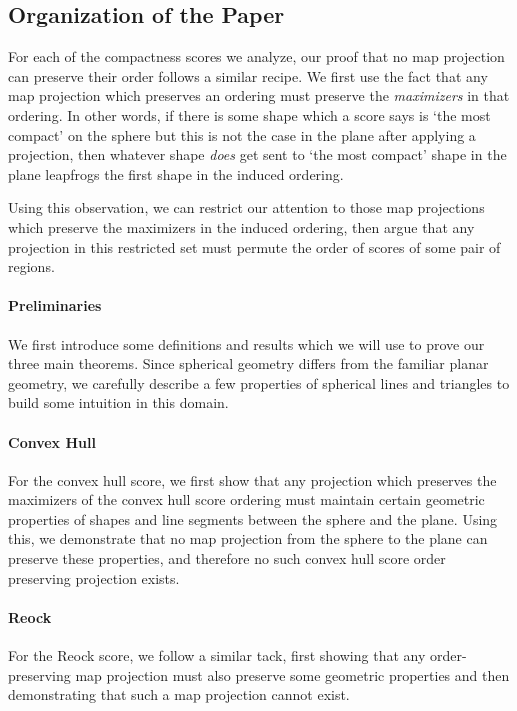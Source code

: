 \subsection{Organization of the Paper}


For each of the compactness scores we analyze, our proof that no map
projection can preserve their order follows a similar recipe. We
first use the fact that any map projection which preserves an ordering
must preserve the \textit{maximizers} in that ordering.  In other words,
if there is some shape which a score says is `the most compact' on the sphere 
but this is not the case in the plane after applying a projection, then whatever 
shape \textit{does} get sent to `the most compact' shape in the plane leapfrogs 
the first shape in the induced ordering.

Using this observation, we can restrict our attention to those map
projections which preserve the maximizers in the induced ordering,
then argue that any projection in this restricted set must permute the
order of scores of some pair of regions.


\paragraph{Preliminaries}
We first introduce some definitions and results which we will use to prove our 
three main theorems.  Since spherical geometry differs from the familiar planar geometry, 
we carefully describe a few properties of spherical lines and triangles to build some intuition 
in this domain. 


\paragraph{Convex Hull}
For the convex hull score, we first 
show that any projection which preserves the maximizers of the convex hull score 
ordering must maintain certain geometric properties of shapes and line segments 
between the sphere and the plane.  Using this, we demonstrate that no 
map projection from the sphere to the plane can preserve these properties, and therefore 
no such convex hull score order preserving projection exists.



\paragraph{Reock}
For the Reock score, we follow a similar tack, first showing that any 
order-preserving map projection must also preserve some geometric properties 
and then demonstrating that such a map projection cannot exist.





